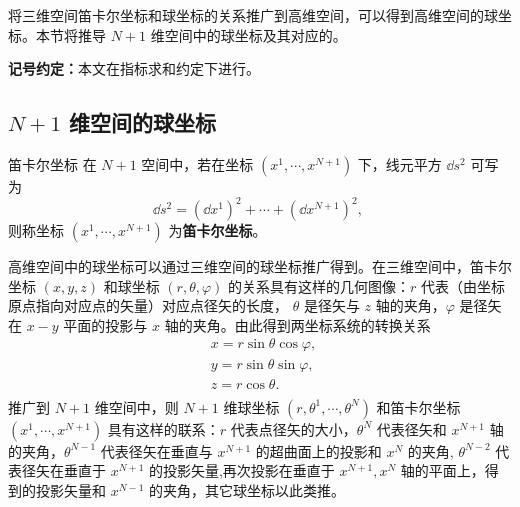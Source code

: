 
将三维空间笛卡尔坐标和球坐标的关系推广到高维空间，可以得到高维空间的球坐标。本节将推导 $N+1$ 维空间中的球坐标及其对应的。

\textbf{记号约定：}本文在指标求和约定下进行。

\subsection{$N+1$ 维空间的球坐标}
\begin{definition}{笛卡尔坐标}\label{def_nDSM_1}
在 $N+1$ 空间中，若在坐标 $(x^1,\cdots,x^{N+1})$ 下，线元平方 $\dd s^2$ 可写为
\begin{equation}\label{eq_nDSM_2}
\dd s^2=(\dd x^1)^2+\cdots+(\dd x^{N+1})^2,~
\end{equation}
 则称坐标 $(x^1,\cdots,x^{N+1})$ 为\textbf{笛卡尔坐标}。
\end{definition}

高维空间中的球坐标可以通过三维空间的球坐标推广得到。在三维空间中，笛卡尔坐标 $(x,y,z)$ 和球坐标 $(r,\theta,\varphi)$ 的关系具有这样的几何图像：$r$ 代表（由坐标原点指向对应点的矢量）对应点径矢的长度， $\theta$ 是径矢与 $z$ 轴的夹角，$\varphi$ 是径矢在 $x-y$ 平面的投影与 $x$ 轴的夹角。由此得到两坐标系统的转换关系
\begin{equation}
\begin{aligned}
&x=r\sin\theta\cos\varphi,\\
&y=r\sin\theta\sin\varphi,\\
&z=r\cos\theta.\\
\end{aligned}~
\end{equation}
推广到 $N+1$ 维空间中，则 $N+1$ 维球坐标 $(r,\theta^1,\cdots,\theta^{N})$ 和笛卡尔坐标 $(x^1,\cdots,x^{N+1})$ 具有这样的联系：$r$ 代表点径矢的大小，$\theta^{N}$ 代表径矢和 $x^{N+1}$ 轴的夹角，$\theta^{N-1}$ 代表径矢在垂直与 $x^{N+1}$ 的超曲面上的投影和 $x^{N}$ 的夹角, $\theta^{N-2}$ 代表径矢在垂直于 $x^{N+1}$ 的投影矢量,再次投影在垂直于 $x^{N+1},x^{N}$ 轴的平面上，得到的投影矢量和 $x^{N-1}$ 的夹角，其它球坐标以此类推。

